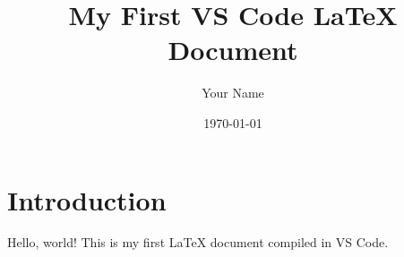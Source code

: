 \documentclass{article}
\title{My First VS Code LaTeX Document}
\author{Your Name}
\date{\today}
\begin{document}
  \maketitle
  \section{Introduction}
  Hello, world! This is my first LaTeX document compiled in VS Code.
\end{document}
